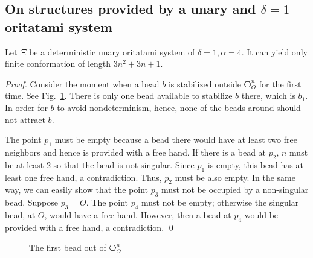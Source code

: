 

\subsection{On structures provided by a unary and $\delta = 1$ oritatami system}


\begin{theorem}[$\delta = 1, \alpha = 4$]
Let $\Xi$ be a deterministic unary oritatami system of $\delta = 1, \alpha = 4$. It can yield only finite conformation of length $3n^2  + 3n + 1$.
\end{theorem}

\begin{proof}
Consider the moment when a bead $b$ is stabilized outside $\hexagon_O^n$ for the first time. 
See Fig.~\ref{TTT_a4_first}.
There is only one bead available to stabilize $b$ there, which is $b_1$. 
In order for $b$ to avoid nondeterminism, hence, none of the beads around should not attract $b$. 

The point $p_1$ must be empty because a bead there would have at least two free neighbors and hence is provided with a free hand. 
If there is a bead at $p_2$, $n$ must be at least 2 so that the bead is not singular. 
Since $p_1$ is empty, this bead has at least one free hand, a contradiction. 
Thus, $p_2$ must be also empty. 
In the same way, we can easily show that the point $p_3$ must not be occupied by a non-singular bead. 
Suppose $p_3 = O$. 
The point $p_4$ must not be empty; otherwise the singular bead, at $O$, would have a free hand. 
However, then a bead at $p_4$ would be provided with a free hand, a contradiction. 
\qed
\end{proof}

\begin{figure}[tb]
 \centering
    \caption{The first bead out of $\hexagon_{O}^n$}
    \label{TTT_a4_first}
\end{figure}



